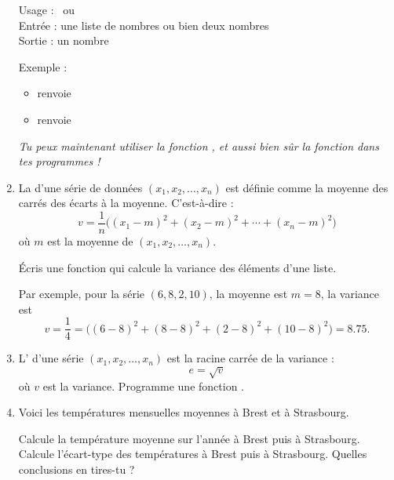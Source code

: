 \documentclass[11pt,class=report,crop=false]{standalone}
\begin{document}
\begin{activite}
\begin{enumerate}
  
  \begin{fonctionpython}
   Usage :  \  ou \  \\
   Entrée : une liste de nombres ou bien deux nombres\\
   Sortie : un nombre
  
  \medskip
     
   Exemple : 
  \begin{itemize}  
    \item {} renvoie   
    \item {} renvoie 
  \end{itemize}    

  \end{fonctionpython}   
  
  \emph{Tu peux maintenant utiliser la fonction , et aussi bien sûr la fonction  dans tes programmes !} 
  
  \item La  d'une série de données $(x_1,x_2,\ldots,x_n)$ est définie comme la moyenne des carrés des écarts à la moyenne. C'est-à-dire :
  $$v = \frac{1}{n}\big((x_1-m)^2 + (x_2-m)^2 + \cdots + (x_n-m)^2\big)$$
  où $m$ est la moyenne de $(x_1,x_2,\ldots,x_n)$.
  
  Écris une fonction  qui calcule la variance des éléments d'une liste.
  
  Par exemple, pour la série $(6,8,2,10)$, la moyenne est $m = 8$, la variance est
  $$v = \frac{1}{4} = \big((6-8)^2 + (8-8)^2 + (2-8)^2 + (10-8)^2\big) = 8.75.$$
  
  \item L' d'une série $(x_1,x_2,\ldots,x_n)$ est la racine carrée de la variance :
  $$e = \sqrt{v}$$
  où $v$ est la variance. Programme une fonction .
  

  \item Voici les températures mensuelles moyennes à Brest et à Strasbourg.
  \centerline{}
  \centerline{}

  Calcule la température moyenne sur l'année à Brest puis à Strasbourg. Calcule l'écart-type 
  des températures à Brest puis à Strasbourg. Quelles conclusions en tires-tu ? 

\end{enumerate}

\end{activite}
\end{document}
